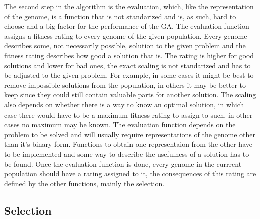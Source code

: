 The second step in the algorithm is the evaluation, which, like the representation of the genome, is a function that is not standarized and is, as such, hard to choose and a big factor for the performance of the GA. The evaluation function assigns a fitness rating to every genome of the given population. Every genome describes some, not necessarily possible, solution to the given problem and the fitness rating describes how good a solution that is. The rating is higher for good solutions and lower for bad ones, the exact scaling is not standarized and has to be adjusted to the given problem. For example, in some cases it might be best to remove impossible solutions from the population, in others it may be better to keep since they could still contain valuable parts for another solution. The scaling also depends on whether there is a way to know an optimal solution, in which case there would have to be a maximum fitness rating to assign to such, in other cases no maximum may be known.
The evaluation function depends on the problem to be solved and will usually require representations of the genome other than it's binary form. Functions to obtain one representaion from the other have to be implemented and some way to describe the usefulness of a solution has to be found.
Once the evaluation function is done, every genome in the currrent population should have a rating assigned to it, the consequences of this rating are defined by the other functions, mainly the selection.

\subsection{Selection}
\label{sec:selection}

